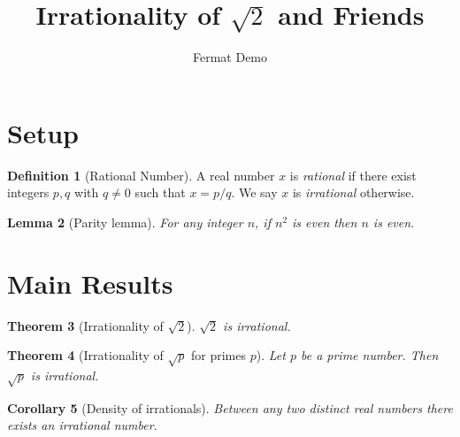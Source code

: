 \documentclass{article}
\title{Irrationality of $\sqrt{2}$ and Friends}
\author{Fermat Demo}
\date{}
\newtheorem{theorem}{Theorem}[section]
\newtheorem{lemma}[theorem]{Lemma}
\newtheorem{corollary}[theorem]{Corollary}
\theoremstyle{definition}
\newtheorem{definition}[theorem]{Definition}
\begin{document}
\maketitle


\section{Setup}

\begin{definition}[Rational Number]
\label{def:rational}
A real number $x$ is \emph{rational} if there exist integers $p, q$ with
$q \neq 0$ such that $x = p/q$.  We say $x$ is \emph{irrational} otherwise.
\end{definition}

\begin{lemma}[Parity lemma]
\label{lem:parity}
For any integer $n$, if $n^2$ is even then $n$ is even.
\end{lemma}

\section{Main Results}

\begin{theorem}[Irrationality of $\sqrt{2}$]
\label{thm:sqrt2}
$\sqrt{2}$ is irrational.
\end{theorem}

\begin{theorem}[Irrationality of $\sqrt{p}$ for primes $p$]
\label{thm:sqrt-prime}
Let $p$ be a prime number.  Then $\sqrt{p}$ is irrational.
\end{theorem}

\begin{corollary}[Density of irrationals]
\label{cor:dense}
Between any two distinct real numbers there exists an irrational number.
\end{corollary}
\end{document}
